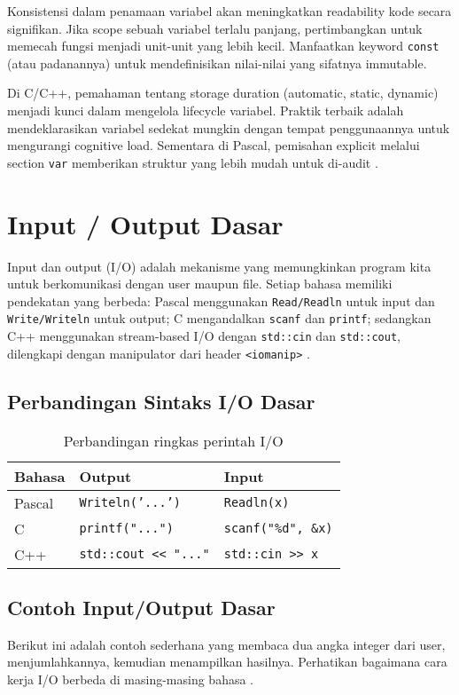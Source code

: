 \documentclass[../main.tex]{subfiles}
\begin{document}
Konsistensi dalam penamaan variabel akan meningkatkan readability kode secara signifikan. Jika scope sebuah variabel terlalu panjang, pertimbangkan untuk memecah fungsi menjadi unit-unit yang lebih kecil. Manfaatkan keyword \texttt{const} (atau padanannya) untuk mendefinisikan nilai-nilai yang sifatnya immutable.

Di C/C++, pemahaman tentang storage duration (automatic, static, dynamic) menjadi kunci dalam mengelola lifecycle variabel. Praktik terbaik adalah mendeklarasikan variabel sedekat mungkin dengan tempat penggunaannya untuk mengurangi cognitive load. Sementara di Pascal, pemisahan explicit melalui section \texttt{var} memberikan struktur yang lebih mudah untuk di-audit \parencite{free-pascal-docs,gnu-c-manual}.

\section{Input / Output Dasar}
Input dan output (I/O) adalah mekanisme yang memungkinkan program kita untuk berkomunikasi dengan user maupun file. Setiap bahasa memiliki pendekatan yang berbeda: Pascal menggunakan \texttt{Read/Readln} untuk input dan \texttt{Write/Writeln} untuk output; C mengandalkan \texttt{scanf} dan \texttt{printf}; sedangkan C++ menggunakan stream-based I/O dengan \texttt{std::cin} dan \texttt{std::cout}, dilengkapi dengan manipulator dari header \texttt{<iomanip>} \parencite{w3pascal-io,gnu-c-manual,cplusplus-io,cpp-iomanip}.

\subsection{Perbandingan Sintaks I/O Dasar}
\begin{table}[H]
  \centering
  \caption{Perbandingan ringkas perintah I/O}
  \label{tab:io-basic}
  \begin{tabular}{@{}lll@{}}
    \toprule
    Bahasa & Output & Input \\
    \midrule
    Pascal & \texttt{Writeln('...')} & \texttt{Readln(x)} \\
    C      & \texttt{printf("...")} & \texttt{scanf("\%d", \&x)} \\
    C++    & \texttt{std::cout << "..."} & \texttt{std::cin >> x} \\
    \bottomrule
  \end{tabular}
\end{table}

\subsection{Contoh Input/Output Dasar}
Berikut ini adalah contoh sederhana yang membaca dua angka integer dari user, menjumlahkannya, kemudian menampilkan hasilnya. Perhatikan bagaimana cara kerja I/O berbeda di masing-masing bahasa \parencite{w3pascal-io,gnu-c-manual,cpp-reference}.
\end{document}
